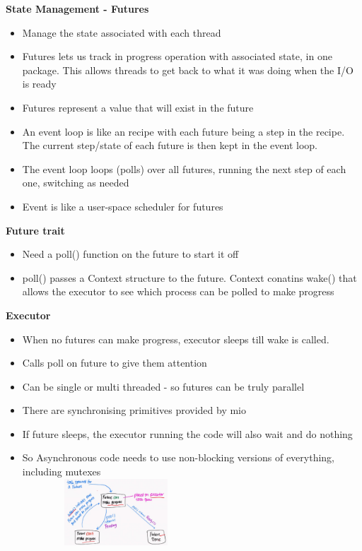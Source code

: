 \documentclass[10pt, landscape]{article}
\begin{document}
\begin{multicols}{4}
\textbf{State Management - Futures} \\
\begin{itemize}
    \item Manage the state associated with each thread
    \item Futures lets us track in progress operation with associated state, in one package. This allows threads to get back to what it was doing when the I/O is ready 
    \item Futures represent a value that will exist in the future
    \item An event loop is like an recipe with each future being a step in the recipe. The current step/state of each future is then kept in the event loop.
    \item The event loop loops (polls) over all futures, running the next step of each one, switching as needed
    \item Event is like a user-space scheduler for futures
\end{itemize}

\textbf{Future trait} \\
\begin{itemize}
    \item Need a poll() function on the future to start it off 
    \item poll() passes a Context structure to the future. Context conatins wake() that allows the executor to see which process can be polled to make progress
\end{itemize}

\textbf{Executor} \\
\begin{itemize}
    \item When no futures can make progress, executor sleeps till wake is called.
    \item Calls poll on future to give them attention
    \item Can be single or multi threaded - so futures can be truly parallel
    \item There are synchronising primitives provided by mio 
    \item If future sleeps, the executor running the code will also wait and do nothing
    \item So Asynchronous code needs to use non-blocking versions of everything, including mutexes\\
    \includegraphics*[width=7cm, height=2.5cm]{executor.png}
\end{itemize}


\end{multicols}
\end{document}

